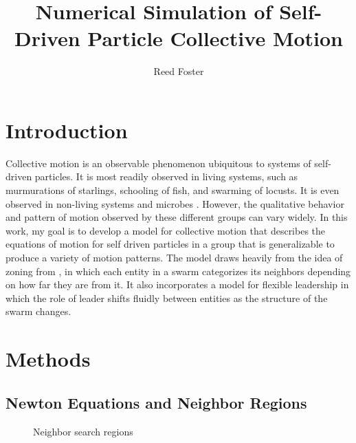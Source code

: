 \documentclass[conference]{IEEEtran}
\begin{document}
\title{Numerical Simulation of Self-Driven Particle Collective Motion}

\author{Reed Foster}

\maketitle

%

\section{Introduction}

Collective motion is an observable phenomenon ubiquitous to systems of self-driven particles.
It is most readily observed in living systems, such as murmurations of starlings, schooling of fish, and swarming of locusts.
It is even observed in non-living systems and microbes \cite{Vicsek}.
However, the qualitative behavior and pattern of motion observed by these different groups can vary widely.
In this work, my goal is to develop a model for collective motion that describes the equations of motion for self driven particles in a group that is generalizable to produce a variety of motion patterns.
The model draws heavily from the idea of zoning from \cite{Couzin}, in which each entity in a swarm categorizes its neighbors depending on how far they are from it.
It also incorporates a model for flexible leadership in which the role of leader shifts fluidly between entities as the structure of the swarm changes.

\section{Methods}

\subsection{Newton Equations and Neighbor Regions}

\begin{figure}[htbp]
    \centering
    \resizebox{0.9\columnwidth}{!}{}
    \caption{Neighbor search regions}
    \label{fig:regions}
\end{figure}
\end{document}
